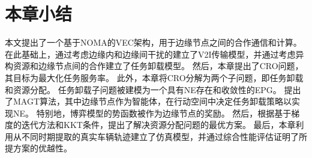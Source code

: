 \section{本章小结}\label{section 3-6}

本文提出了一个基于NOMA的VEC架构，用于边缘节点之间的合作通信和计算。
在此基础上，通过考虑边缘内和边缘间干扰的建立了V2I传输模型，并通过考虑异构资源和边缘节点间的合作建立了任务卸载模型。
然后，本章提出了CRO问题，其目标为最大化任务服务率。
此外，本章将CRO分解为两个子问题，即任务卸载和资源分配。
任务卸载子问题被建模为一个具有NE存在和收敛性的EPG。
提出了MAGT算法，其中边缘节点作为智能体，在行动空间中决定任务卸载策略以实现NE。
特别地，博弈模型的势函数被作为边缘节点的奖励。
然后，根据基于梯度的迭代方法和KKT条件，提出了解决资源分配问题的最优方案。
最后，本章利用从不同时期提取的真实车辆轨迹建立了仿真模型，并通过综合性能评估证明了所提方案的优越性。
